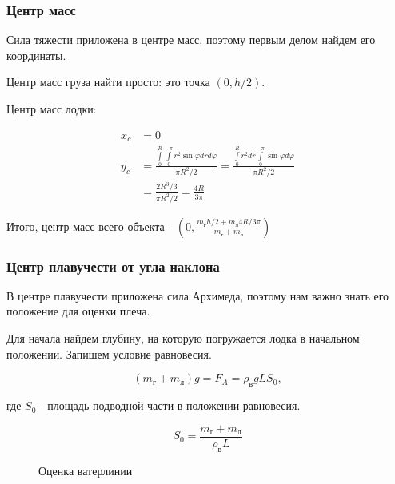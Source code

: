\documentclass[12pt,a4paper]{article}
\newcounter{subsubsubsection}[subsubsection]
\begin{document}
\subsubsection{Центр масс}

Сила тяжести приложена в центре масс, поэтому первым делом найдем его координаты.

Центр масс груза найти просто: это точка $(0, h/2)$.

Центр масс лодки:

\begin{align*}
	x_c & = 0 \\
	y_c & = \frac{\int\limits_0^R \int\limits_0^{-\pi} r^2 \sin \varphi dr d\varphi}{\pi R^2/2} 
		= \frac{\int\limits_0^R r^2 dr \int\limits_0^{-\pi}  \sin \varphi d\varphi}{\pi R^2/2} \\
		& = \frac{2R^3/3}{\pi R^2/2} = \frac{4R}{3\pi} 
\end{align*}

Итого, центр масс всего объекта - $(0, \frac{m_\text{г}h/2 + m_\text{л}4R /3\pi }{m_\text{г} + m_\text{л}})$

\subsubsection{Центр плавучести от угла наклона}

В центре плавучести приложена сила Архимеда, поэтому нам важно знать его положение для оценки плеча.

Для начала найдем глубину, на которую погружается лодка в начальном положении. Запишем условие равновесия.

$$ (m_\text{г} + m_\text{л})g = F_A = \rho_\text{в}gLS_0, $$

где $S_0$ - площадь подводной части в положении равновесия.

$$ S_0 = \frac{m_\text{г} + m_\text{л}}{\rho_\text{в}L} $$

\begin{figure}
	\centering
	\caption{Оценка ватерлинии}	
	\label{fig:waterline}
\end{figure}
\end{document}
